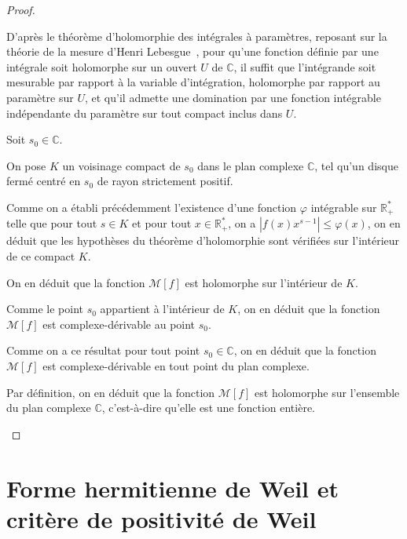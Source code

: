 \documentclass[Riemann_Hypothesis.tex]{subfiles}
\begin{document}
\begin{proof}
    \begin{part_proof}
        D'après le théorème d'holomorphie des intégrales à paramètres, reposant 
        sur la théorie de la mesure 
        d'Henri Lebesgue~\cite{lebesgue1902_these}, pour qu'une fonction définie par une 
        intégrale soit holomorphe sur un ouvert $U$ de $\mathbb{C}$, il suffit que 
        l'intégrande soit mesurable par rapport à la variable d'intégration, holomorphe 
        par rapport au paramètre sur $U$, et qu'il admette une domination par une fonction 
        intégrable indépendante du paramètre sur tout compact inclus dans $U$. \par
        Soit $s_0 \in \mathbb{C}$. \par
        On pose $K$ un voisinage compact de $s_0$ dans le plan complexe $\mathbb{C}$, 
        tel qu'un disque fermé centré en $s_0$ de rayon strictement positif. \par
        Comme on a établi précédemment l'existence d'une fonction $\varphi$ intégrable sur 
        $\mathbb{R}_+^*$ telle que pour tout $s \in K$ et pour tout $x \in \mathbb{R}_+^*$, 
        on a $\left| f(x) x^{s-1} \right| \leq \varphi(x)$, on en déduit que les hypothèses 
        du théorème d'holomorphie sont vérifiées sur l'intérieur de ce compact $K$. \par
        On en déduit que la fonction $\mathcal{M}[f]$ est holomorphe sur l'intérieur de $K$. \par
        Comme le point $s_0$ appartient à l'intérieur de $K$, on en déduit que la fonction 
        $\mathcal{M}[f]$ est complexe-dérivable au point $s_0$. \par
        Comme on a ce résultat pour tout point $s_0 \in \mathbb{C}$, on en déduit que la 
        fonction $\mathcal{M}[f]$ est complexe-dérivable en tout point du plan complexe. \par
        Par définition, on en déduit que la fonction $\mathcal{M}[f]$ est holomorphe sur 
        l'ensemble du plan complexe $\mathbb{C}$, c'est-à-dire qu'elle est une fonction 
        entière.
    \end{part_proof}
\end{proof}

\color{red}
\section{Forme hermitienne de Weil et critère de positivité de Weil}
\color{black}
\end{document}
